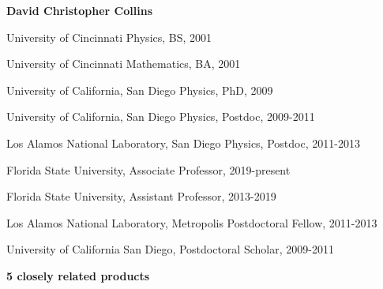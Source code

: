 \documentclass[11pt]{article}
\begin{document}
\noindent 
{\bf\large David Christopher Collins}

\medskip


\noindent
University of Cincinnati \hfill Physics, BS, 2001

\noindent
University of Cincinnati \hfill Mathematics, BA, 2001

\noindent
University of California, San Diego \hfill Physics, PhD, 2009

\noindent
University of California, San Diego \hfill Physics, Postdoc, 2009-2011


\noindent
Los Alamos National Laboratory, San Diego \hfill Physics, Postdoc, 2011-2013



\medskip


\noindent
Florida State University, Associate Professor, \hfill 2019-present

\noindent
Florida State University, Assistant Professor, \hfill 2013-2019

\noindent
Los Alamos National Laboratory, Metropolis Postdoctoral Fellow, \hfill 2011-2013

\noindent
University of California San Diego, Postdoctoral Scholar, \hfill 2009-2011

\medskip

\noindent
\textbf{5 closely related products}
\vspace{-4mm}
\end{document}
